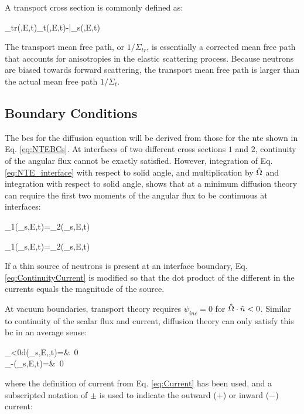 A transport cross section is commonly defined as:

\beq
\label{eq:TransportSigma}
\Sigma_{tr}(,E,t)\equiv\Sigma_t(,E,t)-\bar{\mu}\Sigma_s(,E,t)
\eeq

The transport mean free path, or \(1/\Sigma_{tr}\), is essentially a corrected mean free path that accounts for anisotropies in the elastic scattering process. Because neutrons are biased towards forward scattering, the transport mean free path is larger than the actual mean free path \(1/\Sigma_t\). 

\subsection{Boundary Conditions}

The \glspl{bc} for the diffusion equation will be derived from those for the \gls{nte} shown in Eq. \eqref{eq:NTEBCs}. At interfaces of two different cross sections \(1\) and \(2\), continuity of the angular flux cannot be exactly satisfied. However, integration of Eq. \eqref{eq:NTE_interface} with respect to solid angle, and multiplication by \(\hat{\Omega}\) and integration with respect to solid angle, shows that at a minimum diffusion theory can require the first two moments of the angular flux to be continuous at interfaces:

\beq
\phi_1(_s,E,t)=\phi_2(_s,E,t)
\eeq

\beq
\label{eq:ContinuityCurrent}
_1(_s,E,t)=_2(_s,E,t)
\eeq

If a thin source of neutrons is present at an interface boundary, Eq. \eqref{eq:ContinuityCurrent} is modified so that the dot product of the different in the currents equals the magnitude of the source.

At vacuum boundaries, transport theory requires \(\psi_{inc}=0\) for \(\hat{\Omega}\cdot\hat{n}<0\). Similar to continuity of the scalar flux and current, diffusion theory can only satisfy this \gls{bc} in an average sense:

\beqa
\label{eq:DiffusionVacuumBC}
\int_{\hO\cdot{}<0}d\hO\psi(_s,E,\hO,t)\hO\cdot{}=&\ 0\\
_{-}(_s,E,t)=&\ 0\\
\eeqa

where the definition of current from Eq. \eqref{eq:Current} has been used, and a subscripted notation of \(\pm\) is used to indicate the outward (\(+\)) or inward (\(-\)) current:

